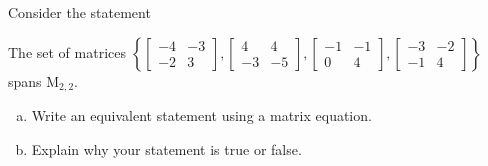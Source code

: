 
\begin{exerciseStatement}


Consider the statement 
\begin{center}\begin{minipage}{0.8\textwidth}
 The set of matrices \( \left\{ \left[\begin{array}{cc}
-4 & -3 \\
-2 & 3
\end{array}\right] , \left[\begin{array}{cc}
4 & 4 \\
-3 & -5
\end{array}\right] , \left[\begin{array}{cc}
-1 & -1 \\
0 & 4
\end{array}\right] , \left[\begin{array}{cc}
-3 & -2 \\
-1 & 4
\end{array}\right] \right\} \) spans \(\mathrm{M}_{2,2}\). 
\end{minipage}\end{center}
    


\begin{enumerate}[(a)]
\item  Write an equivalent statement using a matrix equation.
\item  Explain why your statement is true or false.
\end{enumerate}
    
\end{exerciseStatement}
    
